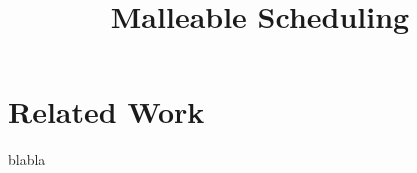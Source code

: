 \documentclass{article}
\author{}
\date{}
\title{Malleable Scheduling}
\begin{document}
    \maketitle
    \section{Related Work}

    blabla
	
\end{document}
